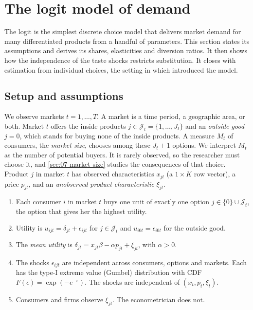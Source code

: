 \section{The logit model of demand}\label{sec:07-logit}

The logit is the simplest discrete choice model that delivers market demand for many differentiated products
from a handful of parameters. This section states its assumptions and derives its shares, elasticities and
diversion ratios. It then shows how the independence of the taste shocks restricts substitution. It closes
with estimation from individual choices, the setting in which \citet{McFadden1974} introduced the model.

\subsection{Setup and assumptions}\label{sec:07-logit-setup}

We observe markets $t = 1, \dots, T$. A market is a time period, a geographic area, or both. Market $t$
offers the inside products $j \in \mathcal{J}_t = \{1, \dots, J_t\}$ and an \emph{outside good} $j = 0$,
which stands for buying none of the inside products. A measure $M_t$ of consumers, the \emph{market size},
chooses among these $J_t + 1$ options. We interpret $M_t$ as the number of potential buyers. It is rarely
observed, so the researcher must choose it, and \cref{sec:07-market-size} studies the consequences of that
choice. Product $j$ in market $t$ has observed characteristics $x_{jt}$ (a $1 \times K$ row vector), a price
$p_{jt}$, and an \emph{unobserved product characteristic} $\xi_{jt}$.

\begin{assumption}\label{asm:07-logit}
\leavevmode
\begin{enumerate}[label=(\roman*)]
  \item Each consumer $i$ in market $t$ buys one unit of exactly one option $j \in \{0\} \cup \mathcal{J}_t$,
  the option that gives her the highest utility.
  \item Utility is $u_{ijt} = \delta_{jt} + \epsilon_{ijt}$ for $j \in \mathcal{J}_t$ and
  $u_{i0t} = \epsilon_{i0t}$ for the outside good.
  \item The \emph{mean utility} is $\delta_{jt} = x_{jt}\beta - \alpha p_{jt} + \xi_{jt}$, with $\alpha > 0$.
  \item The shocks $\epsilon_{ijt}$ are independent across consumers, options and markets. Each has the
  type-I extreme value (Gumbel) distribution with CDF $F(\epsilon) = \exp(-e^{-\epsilon})$. The shocks are
  independent of $(x_t, p_t, \xi_t)$.
  \item Consumers and firms observe $\xi_{jt}$. The econometrician does not.
\end{enumerate}
\end{assumption}

